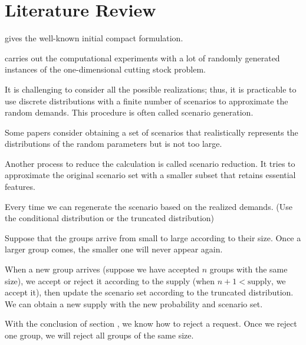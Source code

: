 \section{Literature Review}

\cite{gilmore1961linear} gives the well-known initial compact formulation.

\cite{scheithauer1995modified} carries out the computational experiments with a lot of randomly generated instances of the one-dimensional cutting stock problem. 


%
%
% 

It is challenging to consider all the possible realizations; thus, it is practicable to use discrete distributions with a finite number of scenarios to approximate the random demands. This procedure is often called scenario generation.

Some papers consider obtaining a set of scenarios that realistically represents the distributions of the random parameters but is not too large. \cite{feng2013scenario} \cite{casey2005scenario}
\cite{henrion2018problem}

Another process to reduce the calculation is called scenario reduction. It tries to approximate the original scenario set with a smaller subset that retains essential features.



Every time we can regenerate the scenario based on the realized demands. (Use the conditional distribution or the truncated distribution)


Suppose that the groups arrive from small to large according to their size. Once a larger group comes, the smaller one will never appear again.

When a new group arrives (suppose we have accepted $n$ groups with the same size), we accept or reject it according to the supply (when $n+1 < \text{supply}$, we accept it), then update the scenario set according to the truncated distribution. We can obtain a new supply with the new probability and scenario set.

With the conclusion of section , we know how to reject a request. Once we reject one group, we will reject all groups of the same size. 


\newpage
